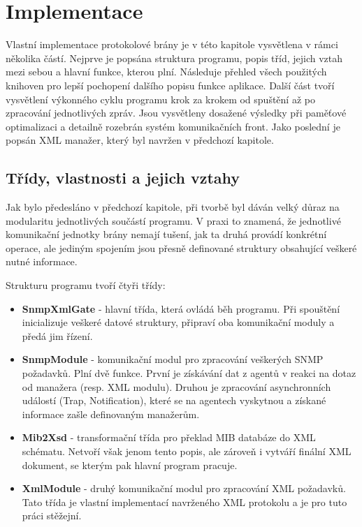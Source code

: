 \chapter{Implementace}
\label{kap_implementace}


Vlastní implementace protokolové brány je v této kapitole vysvětlena v rámci několika částí. Nejprve je popsána
struktura programu, popis tříd, jejich vztah mezi sebou a hlavní funkce, kterou plní. Následuje přehled všech použitých knihoven pro
lepší pochopení dalšího popisu funkce aplikace. Další část tvoří vysvětlení výkonného cyklu programu krok za krokem od spuštění až po
zpracování jednotlivých zpráv. Jsou vysvětleny dosažené výsledky při paměťové optimalizaci a detailně rozebrán systém komunikačních front.
Jako poslední je popsán XML manažer, který byl navržen v předchozí kapitole.

\section{Třídy, vlastnosti a jejich vztahy}
Jak bylo předesláno v předchozí kapitole, při tvorbě byl dáván velký důraz na modularitu jednotlivých součástí programu.
V praxi to znamená, že jednotlivé komunikační jednotky brány nemají tušení, jak ta druhá provádí konkrétní
operace, ale jediným spojením jsou přesně definované struktury obsahující veškeré nutné informace.

Strukturu programu tvoří čtyři třídy:
\begin{itemize}
	\item \textbf{SnmpXmlGate} - hlavní třída, která ovládá běh programu. Při spouštění inicializuje veškeré datové struktury,
	připraví oba komunikační moduly a předá jim řízení.
	\item \textbf{SnmpModule}  - komunikační modul pro zpracování veškerých SNMP požadavků. Plní dvě funkce. První je získávání dat
	z agentů v reakci na dotaz od manažera (resp. XML modulu). Druhou je zpracování asynchronních událostí (Trap, Notification), které
	se na agentech vyskytnou a získané informace zašle definovaným manažerům.
	\item \textbf{Mib2Xsd}	   - transformační třída pro překlad MIB databáze do XML schématu. Netvoří však jenom tento popis, ale zároveň 
	i vytváří finální XML dokument, se kterým pak hlavní program pracuje.
	\item \textbf{XmlModule}   - druhý komunikační modul pro zpracování XML požadavků. Tato třída je vlastní implementací
	navrženého XML protokolu a je pro tuto práci stěžejní.
\end{itemize}

